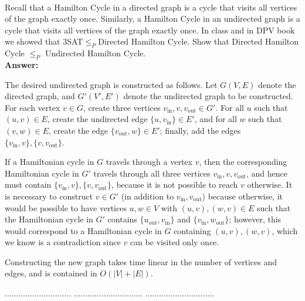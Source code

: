 \documentclass[a4paper,11pt]{article}
\begin{document}
\\
Recall that a Hamilton Cycle in a directed graph is a cycle that visits all vertices of the graph exactly once.
Similarly, a Hamilton Cycle in an undirected graph is a cycle that visits all vertices of the graph exactly once.
In class and in DPV book we showed that 3SAT$\leq_P$Directed Hamilton Cycle. 
Show that Directed Hamilton Cycle $\leq_P$ Undirected Hamilton Cycle.\\
{\bf Answer:} \par
The desired undirected graph is constructed as follows. Let $G(V, E)$ denote the directed graph, and $G'(V', E')$ denote the undirected graph to be constructed. For each vertex $v \in G$, create three vertices $v_{\text{in}}, v, v_{\text{out}} \in G'$. For all $u$ such that $(u, v) \in E$, create the undirected edge $\{ u, v_{\text{in}} \} \in E'$, and for all $w$ such that $(v, w) \in E$, create the edge $\{ v_{\text{out}}, w \} \in E'$; finally, add the edges $\{ v_{\text{in}}, v \}, \{ v, v_\text{out} \}$. \par
If a Hamiltonian cycle in $G$ travels through a vertex $v$, then the corresponding Hamiltonian cycle in $G'$ travels through all three vertices $v_{\text{in}}, v, v_{\text{out}}$, and hence must contain $\{ v_{\text{in}}, v \}, \{ v, v_\text{out} \}$, because it is not possible to reach $v$ otherwise. It is necessary to construct $v \in G'$ (in addition to $v_{\text{in}}, v_{\text{out}}$) because otherwise, it would be possible to have vertices $u, w \in V$ with $(u, v), (w, v) \in E$ such that the Hamiltonian cycle in $G'$ contains $\{ u_\text{out}, v_\text{in} \}$ and $\{ v_\text{in}, w_\text{out} \}$; however, this would correspond to a Hamiltonian cycle in $G$ containing $(u, v), (w, v)$, which we know is a contradiction since $v$ can be visited only once. \par
Constructing the new graph takes time linear in the number of vertices and edges, and is contained in $O(|V| + |E|)$.

\pagebreak

 $.............................$
 $..............................$
          $..............................$\\

\bigskip
\end{document}
